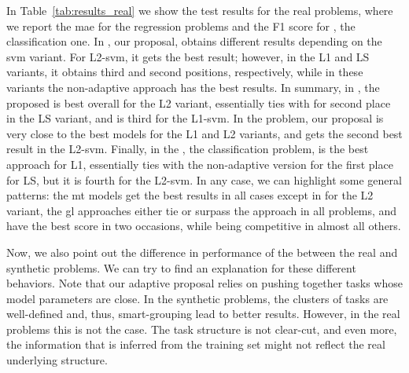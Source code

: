 In Table~\ref{tab:results_real} we show the test results for the real problems, where we report the \acrshort{mae} for the regression problems and the F1 score for , the classification one.
%
In , our proposal,  obtains different results depending on the \acrshort{svm} variant. For L2-\acrshort{svm}, it gets the best result; however, in the L1 and LS variants, it obtains third and second positions, respectively, while%
in these variants the non-adaptive  approach has the best results.
%
In summary, in , the proposed  is best overall for the L2 variant, essentially ties with  for second place in the LS variant, and is third for the L1-\acrshort{svm}.
%
In the  problem, our proposal is very close to the best models for the L1 and L2 variants, and gets the second best result in the L2-\acrshort{svm}.
%
Finally, in the , the classification problem,  is the best approach for L1, essentially ties with the non-adaptive version for the first place for LS, but it is fourth for the L2-\acrshort{svm}.
%
In any case, we can highlight some general patterns: the \acrshort{mt} models get the best results in all cases except in  for the L2 variant, the \acrshort{gl} approaches either tie or surpass the  approach in all problems, and  have the best score in two occasions, while being competitive in almost all others.

Now, we also point out the difference in performance of the  between the real and synthetic problems.
We can try to find an explanation for these different behaviors. Note that our adaptive proposal relies on pushing together tasks whose model parameters are close. In the synthetic problems, the clusters of tasks are well-defined and, thus, smart-grouping lead to better results. However, in the real problems this is not the case. The task structure is not clear-cut, and even more, the information that is inferred from the training set might not reflect the real underlying structure.
%

